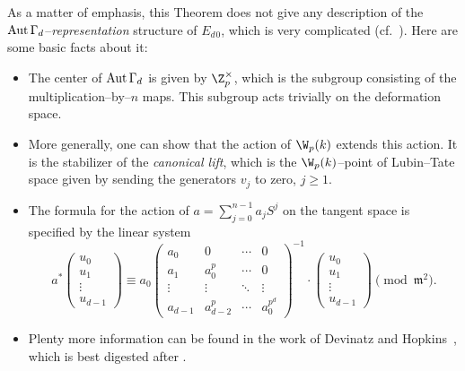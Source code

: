 \begin{remark}\label{StablizerRepIsComplicated}
As a matter of emphasis, this Theorem does not give any description of the \(\operatorname{Aut} \Gamma_d\)--\emph{representation} structure of \(E_d{}_0\), which is very complicated (cf.\ ).  Here are some basic facts about it:
\begin{itemize}
    \item The center of \(\operatorname{Aut} \Gamma_d\) is given by \(\Z_p^\times\), which is the subgroup consisting of the multiplication--by--\(n\) maps.  This subgroup acts trivially on the deformation space.
    \item More generally, one can show that the action of \(\W_p(k)\) extends this action.  It is the stabilizer of the \textit{canonical lift}, which is the \(\W_p(k)\)--point of Lubin--Tate space given by sending the generators \(v_j\) to zero, \(j \ge 1\).
    \item The formula for the action of \(a = \sum_{j=0}^{n-1} a_j S^j\) on the tangent space is specified by the linear system \[a^* \left( \begin{array}{c} u_0 \\ u_1 \\ \vdots \\ u_{d-1} \end{array}\right) \equiv a_0 \left( \begin{array}{cccc} a_0 & 0 & \cdots & 0 \\ a_1 & a_0^p & \cdots & 0 \\ \vdots & \vdots & \ddots & \vdots \\ a_{d-1} & a_{d-2}^p & \cdots & a_0^{p^d} \end{array} \right)^{-1} \cdot \left( \begin{array}{c} u_0 \\ u_1 \\ \vdots \\ u_{d-1} \end{array} \right) \pmod{\mathfrak{m}^2}.\]
    \item Plenty more information can be found in the work of Devinatz and Hopkins~\cite{DevinatzHopkins}, which is best digested after .
\end{itemize}
\end{remark}

